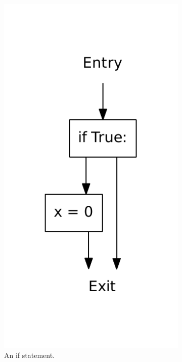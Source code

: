 \begin{figure}
  \centering
  \begin{subfigure}[b]{0.3\textwidth}
    \includegraphics[scale=.5]{./figures/if.pdf}  
    \caption{An if statement.}
    \label{fig:if:if}
  \end{subfigure}
  ~ %
  \begin{subfigure}[b]{0.3\textwidth}

\end{subfigure}
\end{figure}
